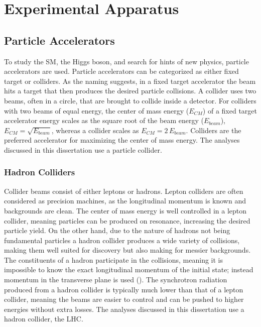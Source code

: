 \chapter{Experimental Apparatus}\label{chap:experiment}

\section{Particle Accelerators}\label{sec:accelerators}
	To study the \gls{SM}, the Higgs boson, and search for hints of new physics, particle accelerators are used. Particle accelerators can be categorized as either fixed target or colliders. As the naming suggests, in a fixed target accelerator the beam hits a target that then produces the desired particle collisions. A collider uses two beams, often in a circle, that are brought to collide inside a detector. For colliders with two beams of equal energy, the center of mass energy ($E_{CM}$) of a fixed target accelerator energy scales as the square root of the beam energy ($E_{beam}$), $E_{CM} = \sqrt{E_{beam}}$, whereas a collider scales as $E_{CM} = 2 \, E_{beam}$. Colliders are the preferred accelerator for maximizing the center of mass energy. The analyses discussed in this dissertation use a particle collider.

	\subsection{Hadron Colliders}\label{ssec:hadron-colliders}
		Collider beams consist of either leptons or hadrons. Lepton colliders are often considered as precision machines, as the longitudinal momentum is known and backgrounds are clean. The center of mass energy is well controlled in a lepton collider, meaning particles can be produced on resonance, increasing the desired particle yield. On the other hand, due to the nature of hadrons not being fundamental particles a hadron collider produces a wide variety of collisions, making them well suited for discovery but also making for messier backgrounds. The constituents of a hadron participate in the collisions, meaning it is impossible to know the exact longitudinal momentum of the initial state; instead momentum in the transverse plane is used (\pt). The synchrotron radiation produced from a hadron collider is typically much lower than that of a lepton collider, meaning the beams are easier to control and can be pushed to higher energies without extra losses. The analyses discussed in this dissertation use a hadron collider, the \acrlong{LHC}.

